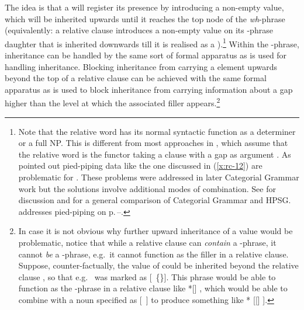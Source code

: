 \documentclass[output=paper
 	        ,biblatex
                ,babelshorthands
                ,newtxmath
                ,draftmode
                ,colorlinks, citecolor=brown
]{langscibook}
\begin{document}
The idea is that a  will register its presence by introducing a non-empty
 value, which will be inherited upwards until it reaches the top node of the \emph{wh}-phrase (equivalently: a relative clause
introduces a non-empty  value on its -phrase daughter that is inherited downwards till it is
realised as a ).\footnote{\label{rc-fn-relative-word-cg}%
  Note that the relative word has its normal syntactic function as a
  determiner or a full NP. This is different from most approaches in , which
  assume that the relative word is the functor taking a clause 
  with a gap as argument \citep[]{Steedman97a}. As \citet{Pollard88a}
  pointed out pied-piping data like the one discussed in (\ref{x:rc-12})
  are problematic for . These problems were addressed in
  later Categorial Grammar work but the solutions involve additional modes of
  combination. See  for discussion and  for
  a general comparison of Categorial Grammar and HPSG. \citeauthor{chapters/cg} addresses pied-piping
  on p.\,\pageref{cg:page-pied-piping-start}--\pageref{cg:page-pied-piping-end}.}
Within the -phrase,  inheritance can
be handled by the same sort of formal apparatus as is used for handling 
inheritance. Blocking  inheritance from carrying a  element
upwards beyond the top of a relative clause can be achieved with the same formal apparatus
as is used to block  inheritance from carrying information about a gap
higher than the level at which the associated filler appears.\footnote{In case it is not
  obvious why further upward inheritance of a  value would be problematic,
  notice that while a relative clause can \emph{contain} a -phrase, it cannot
  \emph{be} a -phrase, e.g.\ it cannot function as the filler in a relative
  clause. Suppose, counter-factually, the  value of  could be inherited
  beyond the relative clause , so that e.g.\  was marked as [~\{\}]. This phrase would be able to
  function as the -phrase in a relative clause like *[] , which would be able to combine with a noun specified as
  [~] to produce something like * [[] ].}
\end{document}
